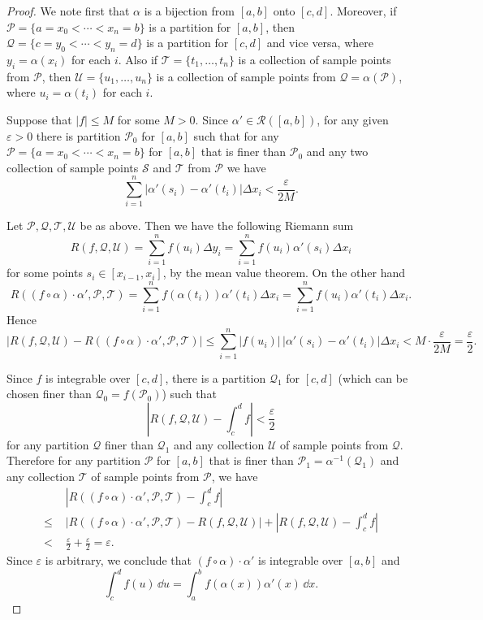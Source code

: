 \begin{proof}
  We note first that $\alpha$ is a bijection from $[a,b]$ onto $[c,d]$.
  Moreover, if $\mathcal{P} = \{ a = x_0 < \cdots < x_n = b \}$ is a partition for $[a,b]$, then $\mathcal{Q} = \{ c = y_0 < \cdots < y_n = d \}$ is a partition for $[c,d]$ and vice versa, where $y_i = \alpha(x_i)$ for each $i$.
  Also if $\mathcal{T} = \{ t_1, \dots, t_n \}$ is a collection of sample points from $\mathcal{P}$, then $\mathcal{U} = \{ u_1, \dots, u_n \}$ is a collection of sample points from $\mathcal{Q} = \alpha(\mathcal{P})$, where $u_i = \alpha(t_i)$ for each $i$.

  Suppose that $|f| \leqslant M$ for some $M > 0$.  Since $\alpha' \in \mathcal{R}([a,b])$, for any given $\varepsilon > 0$ there is partition $\mathcal{P}_0$ for $[a,b]$ such that for any $\mathcal{P} = \{ a = x_0 < \cdots < x_n = b \}$ for $[a,b]$ that is finer than $\mathcal{P}_0$ and any two collection of sample points $\mathcal{S}$ and $\mathcal{T}$ from $\mathcal{P}$ we have
  \[
    \sum_{i=1}^n |\alpha'(s_i) - \alpha'(t_i)| \Delta x_i < \frac{\varepsilon}{2M}.
  \]

  Let $\mathcal{P}, \mathcal{Q}, \mathcal{T}, \mathcal{U}$ be as above.
  Then we have the following Riemann sum
  \[
    R(f,\mathcal{Q},\mathcal{U}) = \sum_{i=1}^n f(u_i) \Delta y_i = \sum_{i=1}^n f(u_i) \alpha'(s_i) \Delta x_i
  \]
  for some points $s_i \in [x_{i-1},x_i]$, by the mean value theorem.
  On the other hand
  \[
    R( (f \circ \alpha) \cdot \alpha', \mathcal{P}, \mathcal{T}) = 
    \sum_{i=1}^n f(\alpha(t_i)) \alpha'(t_i) \Delta x_i = \sum_{i=1}^n f(u_i) \alpha'(t_i) \Delta x_i.
  \]
  Hence
  \[
    | R(f,\mathcal{Q},\mathcal{U}) - R( (f\circ\alpha)\cdot \alpha', \mathcal{P}, \mathcal{T}) | \leqslant \sum_{i=1}^n |f(u_i)| \, |\alpha'(s_i) - \alpha'(t_i)| \Delta x_i < M \cdot \frac{\varepsilon}{2M} = \frac{\varepsilon}{2}.
  \]

  Since $f$ is integrable over $[c,d]$, there is a partition $\mathcal{Q}_1$ for $[c,d]$ (which can be chosen finer than $\mathcal{Q}_0 = f(\mathcal{P}_0)$) such that
  \[
    | R( f, \mathcal{Q}, \mathcal{U} ) - \int_c^d f | < \frac{\varepsilon}{2}
  \]
  for any partition $\mathcal{Q}$ finer than $\mathcal{Q}_1$ and any collection $\mathcal{U}$ of sample points from $\mathcal{Q}$.  Therefore for any partition $\mathcal{P}$ for $[a,b]$ that is finer than $\mathcal{P}_1 = \alpha^{-1}(\mathcal{Q}_1)$ and any collection $\mathcal{T}$ of sample points from $\mathcal{P}$, we have
  \begin{align*}
    &| R( (f\circ \alpha) \cdot \alpha', \mathcal{P}, \mathcal{T} ) - \int_c^d f | \\
    \leqslant \,\, &| R( (f\circ \alpha) \cdot \alpha', \mathcal{P}, \mathcal{T}) - R( f, \mathcal{Q}, \mathcal{U}) | + | R(f,\mathcal{Q},\mathcal{U}) - \int_c^d f| \\ < \,\, &\frac{\varepsilon}{2} + \frac{\varepsilon}{2} =  \varepsilon.
  \end{align*}
  Since $\varepsilon$ is arbitrary, we conclude that $(f \circ \alpha) \cdot \alpha'$ is integrable over $[a,b]$ and
  \[
    \int_c^d f(u) \, \dd u = \int_a^b f(\alpha(x)) \alpha'(x) \, \dd x.
  \]
\end{proof}

